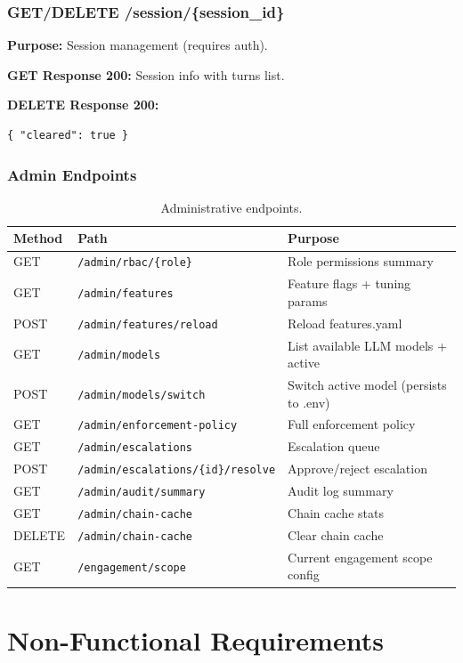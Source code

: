 ﻿\documentclass[10pt,journal,onecolumn]{IEEEtran}
\begin{document}
\subsubsection{GET/DELETE /session/\{session\_id\}}
\textbf{Purpose:} Session management (requires auth).

\textbf{GET Response 200:} Session info with turns list.

\textbf{DELETE Response 200:}
\begin{lstlisting}
{ "cleared": true }
\end{lstlisting}

\subsubsection{Admin Endpoints}
\begin{table}[t]
\caption{Administrative endpoints.}
\label{tab:admin}
\begin{tabularx}{\textwidth}{l >{\ttfamily}l X}
\toprule
\textbf{Method} & \textbf{Path} & \textbf{Purpose}\\
\midrule
GET & \texttt{/admin/rbac/\{role\}} & Role permissions summary\\
GET & \texttt{/admin/features} & Feature flags + tuning params\\
POST & \texttt{/admin/features/reload} & Reload features.yaml\\
GET & \texttt{/admin/models} & List available LLM models + active\\
POST & \texttt{/admin/models/switch} & Switch active model (persists to .env)\\
GET & \texttt{/admin/enforcement-policy} & Full enforcement policy\\
GET & \texttt{/admin/escalations} & Escalation queue\\
POST & \texttt{/admin/escalations/\{id\}/resolve} & Approve/reject escalation\\
GET & \texttt{/admin/audit/summary} & Audit log summary\\
GET & \texttt{/admin/chain-cache} & Chain cache stats\\
DELETE & \texttt{/admin/chain-cache} & Clear chain cache\\
GET & \texttt{/engagement/scope} & Current engagement scope config\\
\bottomrule
\end{tabularx}
\end{table}
\section{Non-Functional Requirements}
\end{document}
